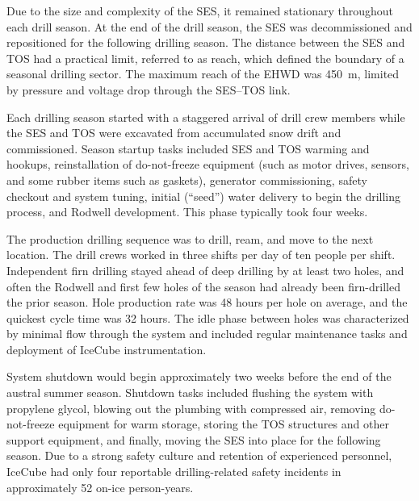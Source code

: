 Due to the size and complexity of the SES, it remained stationary
throughout each drill season.  At the end of the drill season, the SES was
decommissioned and repositioned for the following drilling season.  The
distance between the SES and TOS had a practical limit, referred to as
reach, which defined the boundary of a seasonal drilling sector.  The
maximum reach
of the EHWD was 450~m, limited by pressure and voltage drop through the
SES--TOS link.

Each drilling season started with a staggered arrival of drill crew members
while the SES and TOS were excavated from accumulated snow drift and commissioned.  Season startup
tasks included SES and TOS warming and hookups, reinstallation of
do-not-freeze equipment (such as motor drives, sensors, and some
rubber items such as gaskets), generator commissioning, safety checkout and system
tuning, initial (``seed'') water delivery to begin the drilling process, and Rodwell development.  This phase typically
took four weeks.

The production drilling sequence was to drill, ream, and move to the next
location. The drill crews worked in three shifts per day of ten people
per shift. Independent firn drilling stayed ahead of deep drilling by at
least two holes, and often the Rodwell and first few holes of
the season had already been firn-drilled the prior season. Hole production rate was 48 hours per hole on average,
and the quickest cycle time was 32 hours. The idle phase
between holes was characterized by minimal flow through the
system and included regular maintenance tasks and deployment of IceCube
instrumentation.  

System shutdown would begin approximately two weeks before the end of the
austral summer season. Shutdown tasks included flushing the system with
propylene glycol, blowing out the plumbing with compressed air, removing
do-not-freeze equipment for warm storage, storing the TOS structures and
other support equipment, and finally, moving the SES into place for the
following season.  Due to a strong safety culture and retention of
experienced personnel, IceCube had only
four reportable drilling-related safety incidents in approximately 52 on-ice 
person-years. 


